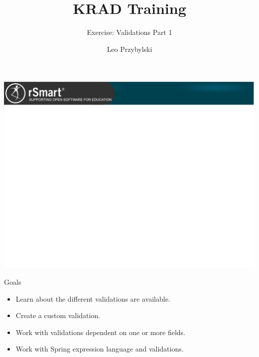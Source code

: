 \documentclass[xcolor=dvipsnames,14pt,professionalfonts]{beamer}
\begin{document}
\title{KRAD Training}
\subtitle{Exercise: Validations Part 1}
\author[Leo]{Leo Przybylski}

\usebackgroundtemplate%
{%
    \includegraphics[width=\paperwidth,height=\paperheight]{../img/header.png}%
}

{
%
\begin{frame}[plain]
  \titlepage
\end{frame}
}

\begin{frame}{Goals}
  \begin{itemize}
    \item Learn about the different validations are available.
    \item Create a custom validation.
    \item Work with validations dependent on one or more fields.
    \item Work with Spring expression language and validations.
  \end{itemize}
\end{frame}
\end{document}
